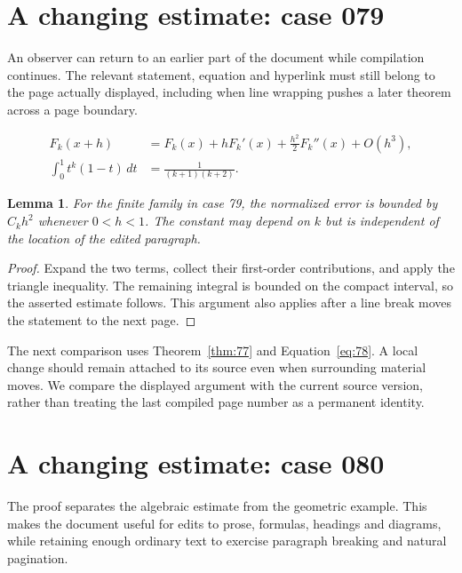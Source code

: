 \documentclass[a4paper,10pt]{article}
\newtheorem{lemma}[theorem]{Lemma}
\begin{document}
\lipsum[13]

\section{A changing estimate: case 079}\label{unit:78}
An observer can return to an earlier part of the document while compilation continues. The relevant statement, equation and hyperlink must still belong to the page actually displayed, including when line wrapping pushes a later theorem across a page boundary.

\lipsum[25-26]
\begin{align}\label{eq:78}
 F_k(x+h)&=F_k(x)+hF_k'(x)+\frac{h^2}{2}F_k''(x)+O(h^3),\\
 \int_0^1 t^k(1-t)\,dt&=\frac{1}{(k+1)(k+2)}.
\end{align}
\begin{lemma}\label{thm:78}
For the finite family in case 79, the normalized error is bounded by $C_k h^2$ whenever $0<h<1$. The constant may depend on $k$ but is independent of the location of the edited paragraph.
\end{lemma}
\begin{proof}
Expand the two terms, collect their first-order contributions, and apply the
triangle inequality. The remaining integral is bounded on the compact interval,
so the asserted estimate follows. This argument also applies after a line break
moves the statement to the next page.
\end{proof}
The next comparison uses Theorem~\ref{thm:77} and Equation~\ref{eq:78}. A local change should remain attached to its source even when surrounding material moves. We compare the displayed argument with the current source version, rather than treating the last compiled page number as a permanent identity.

\lipsum[18]

\section{A changing estimate: case 080}\label{unit:79}
The proof separates the algebraic estimate from the geometric example. This makes the document useful for edits to prose, formulas, headings and diagrams, while retaining enough ordinary text to exercise paragraph breaking and natural pagination.
\end{document}

